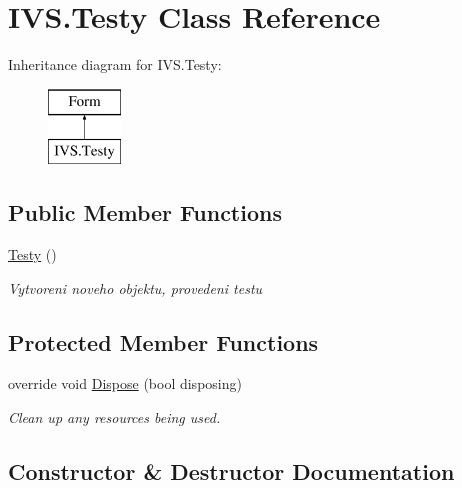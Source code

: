 \hypertarget{class_i_v_s_1_1_testy}{}\section{I\+V\+S.\+Testy Class Reference}
\label{class_i_v_s_1_1_testy}
Inheritance diagram for I\+V\+S.\+Testy\+:\begin{figure}[H]
\begin{center}
\leavevmode
\includegraphics[height=2.000000cm]{class_i_v_s_1_1_testy}
\end{center}
\end{figure}
\subsection*{Public Member Functions}
\begin{DoxyCompactItemize}
\item 
\mbox{\hyperlink{class_i_v_s_1_1_testy_aa23cf506d76f5bc99002eeae9fd2f91c}{Testy}} ()
\begin{DoxyCompactList}\small\item\em Vytvoreni noveho objektu, provedeni testu \end{DoxyCompactList}\end{DoxyCompactItemize}
\subsection*{Protected Member Functions}
\begin{DoxyCompactItemize}
\item 
override void \mbox{\hyperlink{class_i_v_s_1_1_testy_a231cc8b0d786365ab6a36d8e7ef902aa}{Dispose}} (bool disposing)
\begin{DoxyCompactList}\small\item\em Clean up any resources being used. \end{DoxyCompactList}\end{DoxyCompactItemize}


\subsection{Constructor \& Destructor Documentation}
\mbox{\label{class_i_v_s_1_1_testy_aa23cf506d76f5bc99002eeae9fd2f91c}} 
